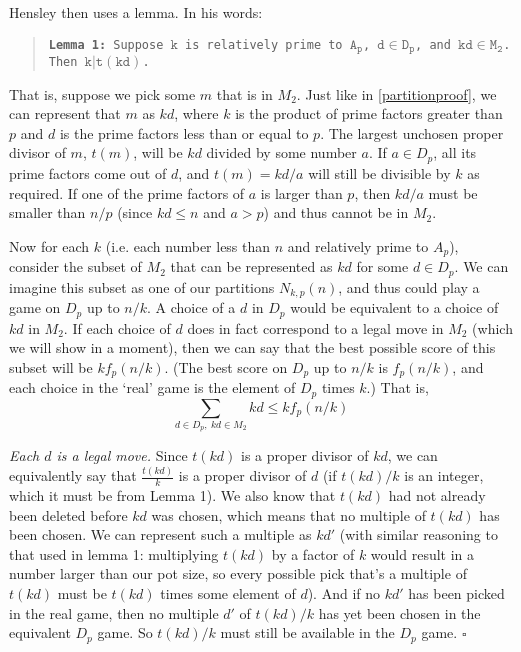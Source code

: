 \documentclass[a4paper,10pt]{amsart} %
\begin{document}
Hensley then uses a lemma. In his words: 
\begin{quote} \label{lemma1}
    \texttt{\textbf{Lemma 1:} Suppose $\mathtt{k}$ is relatively prime to $\mathtt{A_p}$, $\mathtt{d \in D_p}$, and $\mathtt{kd \in M_2}$. Then $\mathtt{k|t(kd)}$.}
\end{quote}
That is, suppose we pick some $m$ that is in $M_2$. Just like in \ref{partitionproof}, we can represent that $m$ as $kd$, where $k$ is the product of prime factors greater than $p$ and $d$ is the prime factors less than or equal to $p$. The largest unchosen proper divisor of $m$, $t(m)$, will be $kd$ divided by some number $a$. If $a \in D_p$, all its prime factors come out of $d$, and $t(m) = kd / a$ will still be divisible by $k$ as required. If one of the prime factors of $a$ is larger than $p$, then $kd / a$ must be smaller than $n/p$ (since $kd \leq n$ and $a > p$) and thus cannot be in $M_2$. 

Now for each $k$ (i.e. each number less than $n$ and relatively prime to $A_p$), consider the subset of $M_2$ that can be represented as $kd$ for some $d \in D_p$. We can imagine this subset as one of our partitions $N_{k,p} (n)$, and thus could play a game on $D_p$ up to $n/k$. A choice of a $d$ in $D_p$ would be equivalent to a choice of $kd$ in $M_2$. If each choice of $d$ does in fact correspond to a legal move in $M_2$ (which we will show in a moment), then we can say that the best possible score of this subset will be $kf_p(n/k)$. (The best score on $D_p$ up to $n/k$ is $f_p(n/k)$, and each choice in the `real' game is the element of $D_p$ times $k$.) That is, 
\begin{equation} \label{shadowgame}
    \sum_{d \in D_p, \ kd \in M_2} kd \leq kf_p (n/k)
\end{equation}

\textit{Each $d$ is a legal move.} Since $t(kd)$ is a proper divisor of $kd$, we can equivalently say that $\frac{t(kd)}{k}$ is a proper divisor of $d$ (if $t(kd)/k$ is an integer, which it must be from Lemma 1). We also know that $t(kd)$ had not already been deleted before $kd$ was chosen, which means that no multiple of $t(kd)$ has been chosen. We can represent such a multiple as $kd'$ (with similar reasoning to that used in lemma 1: multiplying $t(kd)$ by a factor of $k$ would result in a number larger than our pot size, so every possible pick that's a multiple of $t(kd)$ must be $t(kd)$ times some element of $d$). And if no $kd'$ has been picked in the real game, then no multiple $d'$ of $t(kd) / k$ has yet been chosen in the equivalent $D_p$ game. So $t(kd)/k$ must still be available in the $D_p$ game. $\square$
\end{document}
